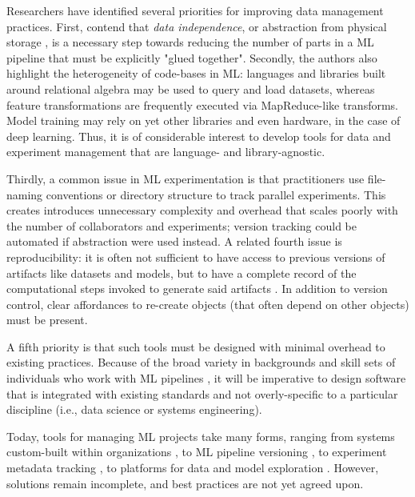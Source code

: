 \documentclass[10pt,sigconf, authordraft]{acmart}
\begin{document}
Researchers have identified several priorities for improving data management practices. First, \citet{Schelter2018OnManagement} contend that \textit{data independence}, or abstraction from physical storage \cite{Tsatalos1996TheIndependence}, is a necessary step towards reducing the number of parts in a ML pipeline that must be explicitly "glued together". Secondly, the authors also highlight the heterogeneity of code-bases in ML: languages and libraries built around relational algebra may be used to query and load datasets, whereas feature transformations are frequently executed via MapReduce-like transforms. Model training may rely on yet other libraries and even hardware, in the case of deep learning. Thus, it is of considerable interest to develop tools for data and experiment management that are language- and library-agnostic. 

Thirdly, a common issue in ML experimentation is that practitioners use file-naming conventions or directory structure to track parallel experiments\cite{Gharibi2019AutomatedExperiments}. This creates introduces unnecessary complexity and overhead that scales poorly with the number of collaborators and experiments; version tracking could be automated if abstraction were used instead. A related fourth issue is reproducibility: it is often not sufficient to have access to previous versions of artifacts like datasets and models, but to have a complete record of the computational steps invoked to generate said artifacts \cite{Davidson2007ProvenanceSystems.,Davidson2008ProvenanceOpportunities}. In addition to version control, clear affordances to re-create objects (that often depend on other objects) must be present. 


A fifth priority is that such tools must be designed with minimal overhead to existing practices. Because of the broad variety in backgrounds and skill sets of individuals who work with ML pipelines \cite{Amershi2019SoftwareStudy,Halevy2016Goods:Datasets,Schelter2018OnManagement}, it will be imperative to design software that is integrated with existing standards and not overly-specific to a particular discipline (i.e., data science or systems engineering). 

Today, tools for managing ML projects take many forms, ranging from systems custom-built within organizations \cite{Halevy2016Goods:Datasets}, to ML pipeline versioning \cite{VanDerWeide2017VersioningPipelines}, to experiment metadata tracking \cite{Gharibi2019AutomatedExperiments}, to platforms for data and model exploration \cite{Bhardwaj2015DataHub:Scale,Vartak2016ModelDB:Management,Miao2017ModelManagement}. However, solutions remain incomplete, and best practices are not yet agreed upon. 
\end{document}
